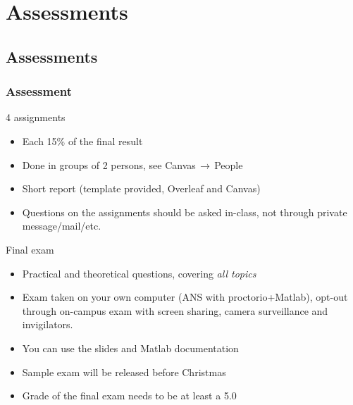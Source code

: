 \section{Assessments}
\subsection{Assessments}
\begin{frame}
 \frametitle{Assessment}
 \begin{block}{4 assignments}
  \begin{itemize}
    \item Each 15\% of the final result
    \item Done in groups of 2 persons, see Canvas$\,\to\,$People
    \item Short report (template provided, Overleaf and Canvas)
    \item Questions on the assignments should be asked in-class, not through private message/mail/etc.
  \end{itemize}   
 \end{block}
 \pause
 \begin{block}{Final exam}
  \begin{itemize}
    \item Practical and theoretical questions, covering \emph{all topics}
    \item Exam taken on your own computer (ANS with proctorio+Matlab), opt-out through on-campus exam with screen sharing, camera surveillance and invigilators.
    \item You can use the slides and Matlab documentation
    \item Sample exam will be released before Christmas
    \item Grade of the final exam needs to be at least a 5.0
  \end{itemize}   
 \end{block}
\end{frame}

